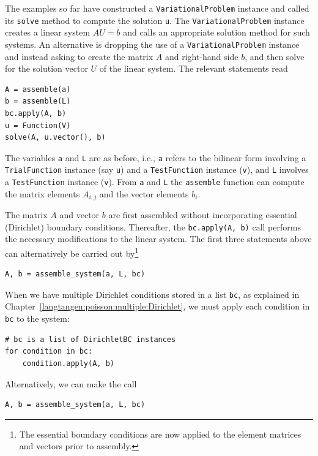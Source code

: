 The examples so far have constructed a {\fontsize{12pt}{12pt}\verb!VariationalProblem!} instance
and called its {\fontsize{12pt}{12pt}\verb!solve!} method to compute the solution
{\fontsize{12pt}{12pt}\verb!u!}.
The {\fontsize{12pt}{12pt}\texttt{VariationalProblem}} instance creates a linear system
$AU=b$ and calls an appropriate solution method for such systems.
An alternative is dropping the use of a {\fontsize{12pt}{12pt}\texttt{VariationalProblem}}
instance and instead asking
\fenics{} to create the matrix $A$
and right-hand side $b$, and then solve for the
solution vector $U$ of the linear system.
The relevant statements read
\begin{Verbatim}[fontsize=\fontsize{10pt}{10pt},tabsize=8,baselinestretch=1.05,
fontfamily=tt,xleftmargin=7mm]
A = assemble(a)
b = assemble(L)
bc.apply(A, b)
u = Function(V)
solve(A, u.vector(), b)
\end{Verbatim}
\noindent
The variables {\fontsize{12pt}{12pt}\texttt{a}} and {\fontsize{12pt}{12pt}\texttt{L}} are as before, i.e., {\fontsize{12pt}{12pt}\texttt{a}} refers to the
bilinear form involving a {\fontsize{12pt}{12pt}\texttt{TrialFunction}} instance (say {\fontsize{12pt}{12pt}\texttt{u}})
and a {\fontsize{12pt}{12pt}\texttt{TestFunction}} instance ({\fontsize{12pt}{12pt}\texttt{v}}), and {\fontsize{12pt}{12pt}\texttt{L}} involves a
{\fontsize{12pt}{12pt}\texttt{TestFunction}} instance ({\fontsize{12pt}{12pt}\texttt{v}}). From {\fontsize{12pt}{12pt}\texttt{a}} and {\fontsize{12pt}{12pt}\texttt{L}}
the {\fontsize{12pt}{12pt}\texttt{assemble}} function can
compute the matrix elements $A_{i,j}$ and the vector elements $b_i$.

The matrix $A$ and vector $b$ are first assembled without incorporating
essential (Dirichlet) boundary conditions. Thereafter, the
{\fontsize{12pt}{12pt}\verb!bc.apply(A, b)!} call performs the necessary modifications to
the linear system. The first three statements above can alternatively
be carried out by\footnote{The essential boundary conditions are
now applied to the element matrices and vectors prior to assembly.}
\begin{Verbatim}[fontsize=\fontsize{10pt}{10pt},tabsize=8,baselinestretch=1.05,
fontfamily=tt,xleftmargin=7mm]
A, b = assemble_system(a, L, bc)
\end{Verbatim}
\noindent

When we have multiple Dirichlet conditions stored in a list {\fontsize{12pt}{12pt}\texttt{bc}},
as explained in
Chapter~\ref{langtangen:poisson:multiple:Dirichlet}, we must apply
each condition in {\fontsize{12pt}{12pt}\texttt{bc}} to the system:
\begin{Verbatim}[fontsize=\fontsize{10pt}{10pt},tabsize=8,baselinestretch=1.05,
fontfamily=tt,xleftmargin=7mm]
# bc is a list of DirichletBC instances
for condition in bc:
    condition.apply(A, b)
\end{Verbatim}
\noindent
Alternatively, we can make the call
\begin{Verbatim}[fontsize=\fontsize{10pt}{10pt},tabsize=8,baselinestretch=1.05,
fontfamily=tt,xleftmargin=7mm]
A, b = assemble_system(a, L, bc)
\end{Verbatim}
\noindent

